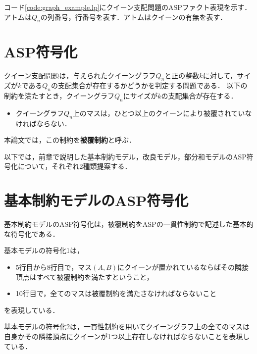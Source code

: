 コード\ref{code:graph_example.lp}にクイーン支配問題のASPファクト表現を示す．
アトムは$Q_n$の列番号，行番号を表す．アトムはクイーンの有無を表す．
\section{ASP符号化}
クイーン支配問題は，与えられたクイーングラフ$Q_n$と正の整数$k$に対して，サイズが$k$である$Q_n$の支配集合が存在するかどうかを判定する問題である．
以下の制約を満たすとき，クイーングラフ$Q_{n}$にサイズが$k$の支配集合が存在する．
\begin{itemize}
 \item クイーングラフ$Q_n$上のマスは，ひとつ以上のクイーンにより被覆されていなければならない．
\end{itemize}

本論文では，この制約を\textbf{被覆制約}と呼ぶ．\par
以下では，前章で説明した基本制約モデル，改良モデル，部分和モデルのASP符号化について，それぞれ2種類提案する．

\section{基本制約モデルのASP符号化}
基本制約モデルのASP符号化は，被覆制約をASPの一貫性制約で記述した基本的な符号化である．



基本モデルの符号化1は，
\begin{itemize}
 \item 5行目から8行目で，マス$(A,B)$にクイーンが置かれているならばその隣接頂点はすべて被覆制約を満たすということ，
 \item 10行目で，全てのマスは被覆制約を満たさなければならないこと
\end{itemize}
を表現している．

\newpage



基本モデルの符号化2は，一貫性制約を用いてクイーングラフ上の全てのマスは自身かその隣接頂点にクイーンが1つ以上存在しなければならないことを表現している．
\newpage
